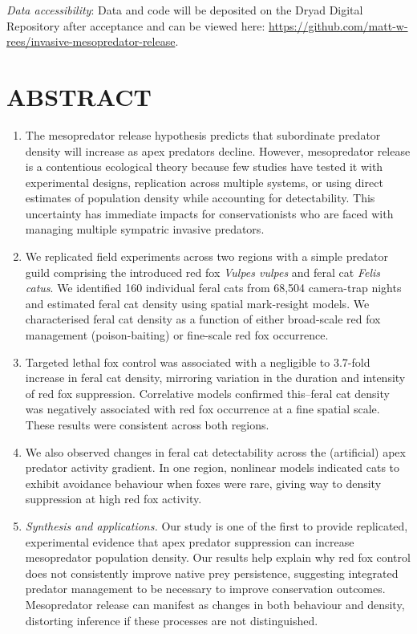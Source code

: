 \documentclass[]{elsarticle} %
\begin{document}
\emph{Data accessibility}: Data and code will be deposited on the Dryad Digital Repository after acceptance and can be viewed here: \url{https://github.com/matt-w-rees/invasive-mesopredator-release}.

\newpage

\linenumbers

\hypertarget{abstract}{%
\section*{ABSTRACT}\label{abstract}}

\begin{enumerate}
\def\labelenumi{\arabic{enumi}.}
\item
  The mesopredator release hypothesis predicts that subordinate predator density will increase as apex predators decline. However, mesopredator release is a contentious ecological theory because few studies have tested it with experimental designs, replication across multiple systems, or using direct estimates of population density while accounting for detectability. This uncertainty has immediate impacts for conservationists who are faced with managing multiple sympatric invasive predators.
\item
  We replicated field experiments across two regions with a simple predator guild comprising the introduced red fox \emph{Vulpes vulpes} and feral cat \emph{Felis catus}. We identified 160 individual feral cats from 68,504 camera-trap nights and estimated feral cat density using spatial mark-resight models. We characterised feral cat density as a function of either broad-scale red fox management (poison-baiting) or fine-scale red fox occurrence.
\item
  Targeted lethal fox control was associated with a negligible to 3.7-fold increase in feral cat density, mirroring variation in the duration and intensity of red fox suppression. Correlative models confirmed this--feral cat density was negatively associated with red fox occurrence at a fine spatial scale. These results were consistent across both regions.
\item
  We also observed changes in feral cat detectability across the (artificial) apex predator activity gradient. In one region, nonlinear models indicated cats to exhibit avoidance behaviour when foxes were rare, giving way to density suppression at high red fox activity.
\item
  \emph{Synthesis and applications.} Our study is one of the first to provide replicated, experimental evidence that apex predator suppression can increase mesopredator population density. Our results help explain why red fox control does not consistently improve native prey persistence, suggesting integrated predator management to be necessary to improve conservation outcomes. Mesopredator release can manifest as changes in both behaviour and density, distorting inference if these processes are not distinguished.
\end{enumerate}
\end{document}

